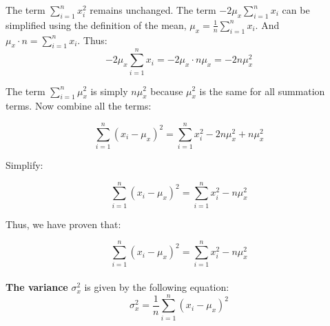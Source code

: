 \documentclass{article}
\begin{document}
The term \( \sum_{i=1}^{n} x_i^2 \) remains unchanged. The term \( -2\mu_x \sum_{i=1}^{n} x_i \) can be simplified using the definition of the mean, \( \mu_x = \frac{1}{n} \sum_{i=1}^{n} x_i \). And \( \mu_x \cdot n = \sum_{i=1}^{n} x_i \). Thus:
  \[
  -2\mu_x \sum_{i=1}^{n} x_i = -2\mu_x \cdot n \mu_x = -2n \mu_x^2
  \]
  
The term \( \sum_{i=1}^{n} \mu_x^2 \) is simply \( n \mu_x^2 \) because \( \mu_x^2 \) is the same for all summation terms. Now combine all the terms:

\[
\sum_{i=1}^{n} (x_i - \mu_x)^2 = \sum_{i=1}^{n} x_i^2 - 2n \mu_x^2 + n \mu_x^2
\]

Simplify:

\[
\sum_{i=1}^{n} (x_i - \mu_x)^2 = \sum_{i=1}^{n} x_i^2 - n \mu_x^2
\]

Thus, we have proven that:

\[
\sum_{i=1}^{n} (x_i - \mu_x)^2 = \sum_{i=1}^{n} x_i^2 - n \mu_x^2
\] \\
\textbf{The variance} \( \sigma_x^2 \) is given by the following equation:
\begin{equation}
    \sigma_x^2 = \frac{1}{n} \sum_{i=1}^{n} (x_i - \mu_x)^2
\end{equation}
\end{document}
